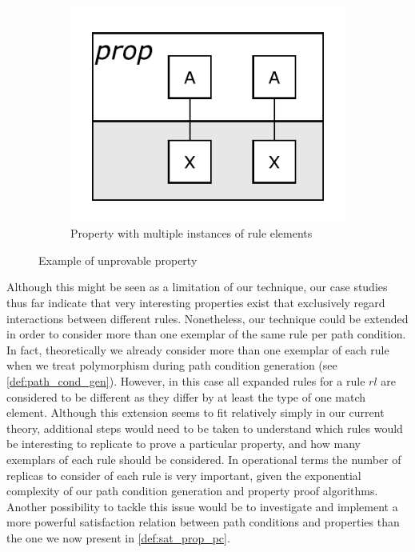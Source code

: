 \begin{figure}[htb]
\begin{subfigure}[b]{0.20\textwidth}
                \includegraphics[width=1\textwidth]{./figures/property_proving/unprovable_prop.pdf}
                \caption{Property with multiple instances of rule elements}
                \label{fig:unprovable_prop}
        \end{subfigure}%
        \caption{Example of unprovable property}
        \label{fig:unprovable_property}
\end{figure}

Although this might be seen as a limitation of our technique, our case studies thus far indicate that very interesting properties exist that exclusively regard interactions between different rules. Nonetheless, our technique could be extended in order to consider more than one exemplar of the same rule per path condition. In fact, theoretically we already consider more than one exemplar of each rule when we treat polymorphism during path condition generation (see \cref{def:path_cond_gen}). However, in this case all expanded rules for a rule $rl$ are considered to be different as they differ by at least the type of one match element. Although this extension seems to fit relatively simply in our current theory, additional steps would need to be taken to understand which rules would be interesting to replicate to prove a particular property, and how many exemplars of each rule should be considered. In operational terms the number of replicas to consider of each rule is very important, given the exponential complexity of our path condition generation and property proof algorithms. Another possibility to tackle this issue would be to investigate and implement a more powerful satisfaction relation between path conditions and properties than the one we now present in \cref{def:sat_prop_pc}.

